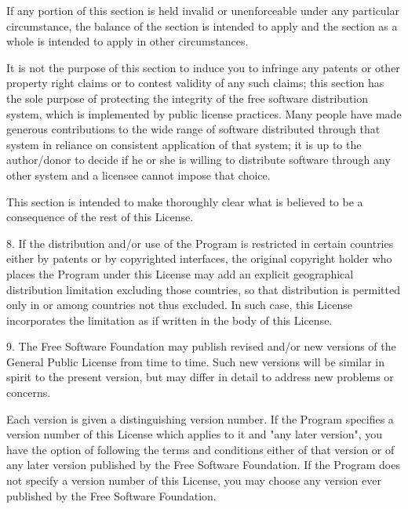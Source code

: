 \begin{DoxyCodeInclude}
If any portion of \textcolor{keyword}{this} section is held invalid or unenforceable under
any particular circumstance, the balance of the section is intended to
apply and the section as a whole is intended to apply in other
circumstances.

It is not the purpose of \textcolor{keyword}{this} section to induce you to infringe any
patents or other \textcolor{keyword}{property} right claims or to contest validity of any
such claims; \textcolor{keyword}{this} section has the sole purpose of protecting the
integrity of the free software distribution system, which is
implemented by \textcolor{keyword}{public} license practices.  Many people have made
generous contributions to the wide range of software distributed
through that system in reliance on consistent application of that
system; it is up to the author/donor to decide \textcolor{keywordflow}{if} he or she is willing
to distribute software through any other system and a licensee cannot
impose that choice.

This section is intended to make thoroughly clear what is believed to
be a consequence of the rest of \textcolor{keyword}{this} License.

  8. If the distribution and/or use of the Program is restricted in
certain countries either by patents or by copyrighted interfaces, the
original copyright holder who places the Program under \textcolor{keyword}{this} License
may add an \textcolor{keyword}{explicit} geographical distribution limitation excluding
those countries, so that distribution is permitted only in or among
countries not thus excluded.  In such \textcolor{keywordflow}{case}, \textcolor{keyword}{this} License incorporates
the limitation as \textcolor{keywordflow}{if} written in the body of \textcolor{keyword}{this} License.

  9. The Free Software Foundation may publish revised and/or \textcolor{keyword}{new} versions
of the General Public License from time to time.  Such \textcolor{keyword}{new} versions will
be similar in spirit to the present version, but may differ in detail to
address \textcolor{keyword}{new} problems or concerns.

Each version is given a distinguishing version number.  If the Program
specifies a version number of \textcolor{keyword}{this} License which applies to it and \textcolor{stringliteral}{"any}
\textcolor{stringliteral}{later version"}, you have the option of following the terms and conditions
either of that version or of any later version published by the Free
Software Foundation.  If the Program does not specify a version number of
\textcolor{keyword}{this} License, you may choose any version ever published by the Free Software
Foundation.


\end{DoxyCodeInclude}
